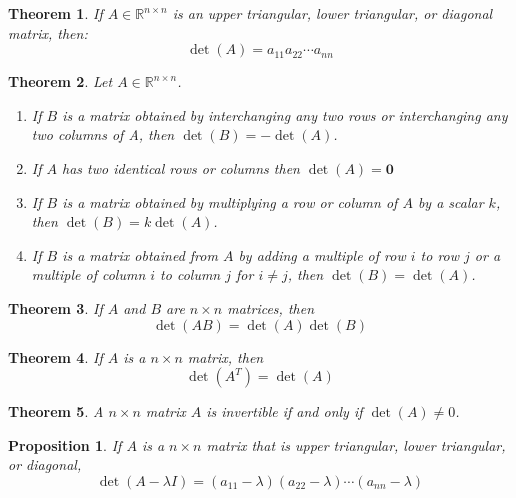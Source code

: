 \documentclass{article}
\theoremstyle{definitionstyle}
\newtheorem{theorem}{Theorem}[section]
\newtheorem{proposition}{Proposition}[section]
\begin{document}
\begin{theorem}
    If $A \in \mathbb{R}^{n \times n}$ is an upper triangular, lower triangular, or diagonal matrix, then:
    \begin{equation*}
        \det(A)=a_{1 1}a_{2 2}\cdots a_{nn}
    \end{equation*}
\end{theorem}

\begin{theorem}
    Let $A \in \mathbb{R}^{n \times n}$.
    \begin{enumerate}
        \item If $B$ is a matrix obtained by interchanging any two rows or interchanging any two columns of A, then $\det(B)=-\det(A)$.
        \item If $A$ has two identical rows or columns then $\det(A)=\mathbf{0}$
        \item If $B$ is a matrix obtained by multiplying a row or column of $A$ by a scalar $k$, then
        $\det(B)=k\det(A)$.
        \item If $B$ is a matrix obtained from $A$ by adding a multiple of row $i$ to row $j$ or a multiple of 
        column $i$ to column $j$ for $i \ne j$, then $\det(B)=\det(A)$.
    \end{enumerate}
\end{theorem}

\begin{theorem}
    If $A$ and $B$ are $n \times n$ matrices, then
    \begin{equation*}
        \det(AB)=\det(A)\det(B)
    \end{equation*}
\end{theorem}

\begin{theorem}
    If $A$ is a $n \times n$ matrix, then
    \begin{equation*}
        \det(A^T)=\det(A)
    \end{equation*}
\end{theorem}

\begin{theorem}
    A $n \times n$ matrix $A$ is invertible if and only if $\det(A) \ne 0$.
\end{theorem}

\begin{proposition}
    If $A$ is a $n \times n$ matrix that is upper triangular, lower triangular, or diagonal,
    \begin{equation*}
        \det(A-\lambda I) = (a_{11} - \lambda)(a_{22} - \lambda)\cdots(a_{nn}-\lambda)
    \end{equation*}
\end{proposition}
\end{document}
